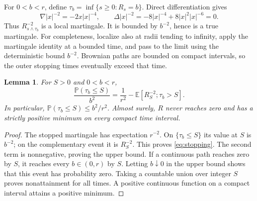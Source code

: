 \documentclass[11pt]{article}
\newtheorem{lemma}[theorem]{Lemma}
\theoremstyle{remark}\newtheorem{remark}[theorem]{Remark}
\newcommand{\E}{\mathbb E}\newcommand{\Pp}{\mathbb P}
\begin{document}
For $0<b<r$, define $\tau_b=\inf\{s\ge0:R_s=b\}$. Direct differentiation gives
\[
 \nabla |x|^{-2}=-2x|x|^{-4},\qquad
 \Delta |x|^{-2}=-8|x|^{-4}+8|x|^2|x|^{-6}=0.
\]
Thus $R_{s\wedge\tau_b}^{-2}$ is a local martingale. It is bounded by $b^{-2}$, hence is a true martingale. For completeness, localize also at radii tending to infinity, apply the martingale identity at a bounded time, and pass to the limit using the deterministic bound $b^{-2}$. Brownian paths are bounded on compact intervals, so the outer stopping times eventually exceed that time.

\begin{lemma}\label{lem:stopping}
For $S>0$ and $0<b<r$,
\begin{equation}\label{eq:stopping}
 \frac{\Pp(\tau_b\le S)}{b^2}
 =\frac1{r^2}-\E[R_S^{-2};\tau_b>S].
\end{equation}
In particular, $\Pp(\tau_b\le S)\le b^2/r^2$. Almost surely, $R$ never reaches zero and has a strictly positive minimum on every compact time interval.
\end{lemma}
\begin{proof}
The stopped martingale has expectation $r^{-2}$. On $\{\tau_b\le S\}$ its value at $S$ is $b^{-2}$; on the complementary event it is $R_S^{-2}$. This proves \eqref{eq:stopping}. The second term is nonnegative, proving the upper bound. If a continuous path reaches zero by $S$, it reaches every $b\in(0,r)$ by $S$. Letting $b\downarrow0$ in the upper bound shows that this event has probability zero. Taking a countable union over integer $S$ proves nonattainment for all times. A positive continuous function on a compact interval attains a positive minimum.
\end{proof}
\end{document}
